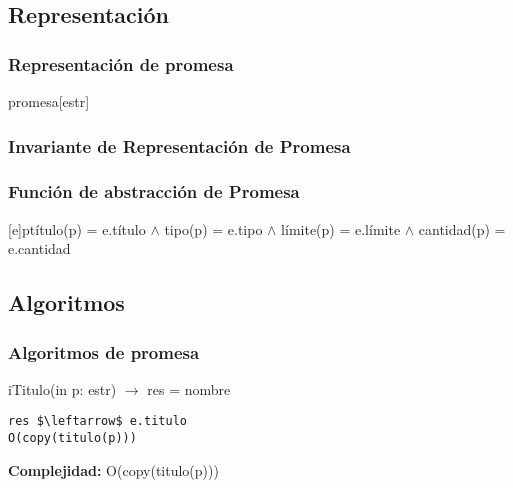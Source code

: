 
\subsection{Representaci\'on}
\subsubsection{Representaci\'on de promesa}
\begin{Estructura}{promesa}[estr]
    \begin{Tupla}[estr]
    \end{Tupla}
\end{Estructura}

 \subsubsection{Invariante de Representaci\'on de Promesa}


\subsubsection{Funci\'on de abstracci\'on de Promesa}

[e]{p}{t\'itulo(p) = e.t\'itulo $\land$ tipo(p) = e.tipo $\land$ l\'imite(p) = e.l\'imite $\land$ cantidad(p) = e.cantidad}

  \subsection{Algoritmos}
\subsubsection{Algoritmos de promesa}

iTitulo(in p: estr) $\rightarrow$ res = nombre
\begin{lstlisting}[mathescape]
 res $\leftarrow$ e.titulo                                                         O(copy(titulo(p)))
\end{lstlisting}
\textbf{Complejidad:} O(copy(titulo(p)))

